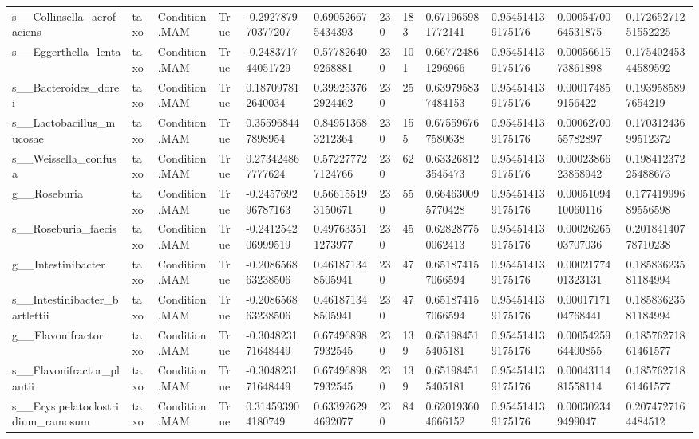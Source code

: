 \begin{longtable}{llllllllllll}
s\_\_Collinsella\_aerofaciens & taxo & Condition.MAM & True & -0.292787970377207 & 0.690526675434393 & 230 & 183 & 0.671965981772141 & 0.954514139175176 & 0.0005470064531875 & 0.17265271251552225 \\
s\_\_Eggerthella\_lenta & taxo & Condition.MAM & True & -0.248371744051729 & 0.577826409268881 & 230 & 101 & 0.667724861296966 & 0.954514139175176 & 0.0005661573861898 & 0.17540245344589592 \\
s\_\_Bacteroides\_dorei & taxo & Condition.MAM & True & 0.187097812640034 & 0.399253762924462 & 230 & 25 & 0.639795837484153 & 0.954514139175176 & 0.000174859156422 & 0.1939585897654219 \\
s\_\_Lactobacillus\_mucosae & taxo & Condition.MAM & True & 0.355968447898954 & 0.849513683212364 & 230 & 155 & 0.675596767580638 & 0.954514139175176 & 0.0006270055782897 & 0.17031243699512372 \\
s\_\_Weissella\_confusa & taxo & Condition.MAM & True & 0.273424867777624 & 0.572277727124766 & 230 & 62 & 0.633268123545473 & 0.954514139175176 & 0.0002386623858942 & 0.19841237225488673 \\
g\_\_Roseburia & taxo & Condition.MAM & True & -0.245769296787163 & 0.566155193150671 & 230 & 55 & 0.664630095770428 & 0.954514139175176 & 0.0005109410060116 & 0.17741999689556598 \\
s\_\_Roseburia\_faecis & taxo & Condition.MAM & True & -0.241254206999519 & 0.497633511273977 & 230 & 45 & 0.628287750062413 & 0.954514139175176 & 0.0002626503707036 & 0.20184140778710238 \\
g\_\_Intestinibacter & taxo & Condition.MAM & True & -0.208656863238506 & 0.461871348505941 & 230 & 47 & 0.651874157066594 & 0.954514139175176 & 0.0002177401323131 & 0.18583623581184994 \\
s\_\_Intestinibacter\_bartlettii & taxo & Condition.MAM & True & -0.208656863238506 & 0.461871348505941 & 230 & 47 & 0.651874157066594 & 0.954514139175176 & 0.0001717104768441 & 0.18583623581184994 \\
g\_\_Flavonifractor & taxo & Condition.MAM & True & -0.304823171648449 & 0.674968987932545 & 230 & 139 & 0.651984515405181 & 0.954514139175176 & 0.0005425964400855 & 0.18576271861461577 \\
s\_\_Flavonifractor\_plautii & taxo & Condition.MAM & True & -0.304823171648449 & 0.674968987932545 & 230 & 139 & 0.651984515405181 & 0.954514139175176 & 0.0004311481558114 & 0.18576271861461577 \\
s\_\_Erysipelatoclostridium\_ramosum & taxo & Condition.MAM & True & 0.314593904180749 & 0.633926294692077 & 230 & 84 & 0.620193604666152 & 0.954514139175176 & 0.000302349499047 & 0.2074727164484512 \\

\end{longtable}
